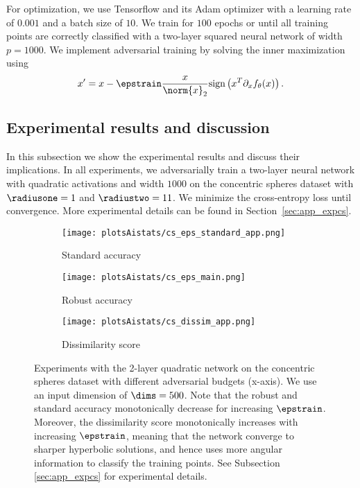 For optimization, we use Tensorflow \cite{tensorflow2015-whitepaper} and its Adam optimizer with a learning rate of $0.001$ and a batch size of $10$. We train for $100$ epochs or until all training points are correctly classified with a two-layer squared neural network of width $p = 1000$. We implement adversarial training by solving the inner maximization using
\begin{equation}
\label{eq:csATmaximization}
    x' = x-\epstrain\frac{x}{\norm{x}_2}\text{sign}\left(x^T \partial_x f_{\theta}(x)\right).
\end{equation}

\subsection{Experimental results and discussion}
In this subsection we show the experimental results and discuss their implications.
In all experiments, we adversarially train a two-layer neural network with quadratic
activations and width $1000$ on the concentric spheres dataset with
$\radiusone=1$ and $\radiustwo=11$. We minimize the cross-entropy loss until
convergence. More experimental details can be found in
Section~\ref{sec:app_expcs}.

\begin{figure}[!t]
\vskip 0.2in
\centering
\begin{subfigure}[b]{0.33\textwidth}
  \texttt{[image: plotsAistats/cs\_eps\_standard\_app.png]}
  \caption{Standard accuracy}
  \label{fig:app_cs_dissim}
\end{subfigure}
\begin{subfigure}[b]{0.33\textwidth}
  \texttt{[image: plotsAistats/cs\_eps\_main.png]}
  \caption{Robust accuracy}
  \label{fig:app_cs_repeat}
\end{subfigure}
\begin{subfigure}[b]{0.33\textwidth}
  \texttt{[image: plotsAistats/cs\_dissim\_app.png]}
  \caption{Dissimilarity score}
  \label{fig:app_cs_dissim}
\end{subfigure}

\caption{Experiments with the 2-layer quadratic network on the concentric spheres dataset with different adversarial budgets (x-axis). We use an input dimension of $\dims = 500$. Note that the robust and standard accuracy monotonically decrease for increasing $\epstrain$. Moreover, the dissimilarity score monotonically increases with increasing $\epstrain$, meaning that the network converge to sharper hyperbolic solutions, and hence uses more angular information to classify the training points. See Subsection \ref{sec:app_expcs} for experimental details.}
\label{fig:app_eps_cs}
\end{figure}

